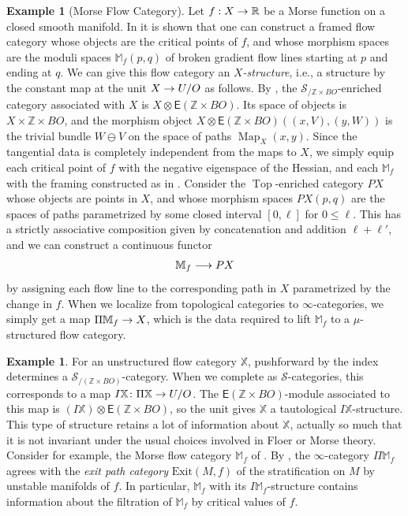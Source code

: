 \documentclass[10pt]{amsart}
\numberwithin{equation}{section}
\theoremstyle{definition}
\newtheorem{ex}[prop]{Example}
\DeclareMathOperator{\Map}{Map}
\DeclareMathOperator{\Top}{Top}
\newcommand{\bM}{\mathbb{M}}
\newcommand{\bZ}{\mathbb{Z}}
\newcommand{\bR}{\mathbb{R}}
\newcommand{\bX}{\mathbb{X}}
\newcommand{\cS}{\mathcal{S}}
\newcommand{\sfE}{\mathsf{E}}
\renewcommand{\to}{\mathchoice{\longrightarrow}{\rightarrow}{}{}}
\begin{document}
\begin{ex}[Morse Flow Category]\label{ex:morse_flow_cat}
	Let $f : X \to \bR$ be a Morse function on a closed smooth manifold.
  In \cite{cohen2020floer} it is shown that one can construct a framed flow category whose objects are the critical points of $f$, and whose morphism spaces are the moduli spaces $\bM_{f}(p,q)$ of broken gradient flow lines starting at $p$ and ending at $q$. We can give this flow category an \emph{$X$-structure}, i.e., a structure by the constant map at the unit $X\to U/O$ as follows.
  By , the $\cS_{/\bZ\times BO}$-enriched category associated with $X$ is $X\otimes\sfE(\bZ\times BO)$.
  Its space of objects is $X\times \bZ\times BO$, and the morphism object $X\otimes\sfE(\bZ\times BO)( (x,V), (y,W)  )$ is the trivial bundle $W\ominus V$ on the space of paths $\Map_{X}(x,y)$.
  Since the tangential data is completely independent from the maps to $X$, we simply equip each critical point of $f$ with the negative eigenspace of the Hessian, and each $\bM_{f}$ with the framing constructed as in \cite{cohen2020floer}.
  Consider the $\Top$-enriched category $PX$ whose objects are points in $X$, and whose morphism spaces $PX(p,q)$ are the spaces of paths parametrized by some closed interval $[0,\ell]$ for $0\leq \ell$.
	This has a strictly associative composition given by concatenation and addition $\ell + \ell'$, and we can construct a continuous functor
	\begin{align*}
		\bM_{f} \to PX
	\end{align*}
	by assigning each flow line to the corresponding path in $X$ parametrized by the change in $f$.
	When we localize from topological categories to $\infty$-categories, we simply get a map $\Pi\bM_{f} \to X$, which is the data required to lift $\bM_{f}$ to a $\mu$-structured flow category.
\end{ex}

\begin{ex}\label{ex:tautological_structure}
	For an unstructured flow category $\bX$, pushforward by the index determines a $\cS_{/ (\bZ\times BO)}$-category.
  When we complete as $\cS$-categories, this corresponds to a map $I\bX\colon \Pi \bX \to U/O$. The $\sfE (\bZ\times BO)$-module associated to this map is $(I\bX) \otimes \sfE(\bZ\times BO)$, so the unit gives $\bX$ a tautological $I\bX$-structure.
	This type of structure retains a lot of information about $\bX$, actually so much that it is not invariant under the usual choices involved in Floer or Morse theory.
  Consider for example, the Morse flow category $\bM_{f}$ of .
  By \cite{fourel2026}, the $\infty$-category $\Pi\bM_{f}$ agrees with the \emph{exit path category} $\mathrm{Exit}(M,f)$ of the stratification on $M$ by unstable manifolds of $f$.
  In particular, $\bM_{f}$ with its $I\bM_{f}$-structure contains information about the filtration of $\bM_{f}$ by critical values of $f$.
\end{ex}
\end{document}
